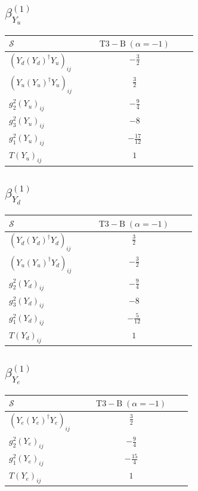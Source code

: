 \documentclass[9pt]{article}
\begin{document}
\subsection*{$ \beta_{Y_u}^{(1)} $}
\begin{longtable}{@{}p{0.38\linewidth}c@{}}
\toprule
$\mathcal{S}$ & $ \mathrm{T3-B}\;(\alpha=-1) $ \\
\midrule
$ (Y_d (Y_d)^{\dagger} Y_u)_{ij} $ & $ - \frac{3}{2} $ \\
$ (Y_u (Y_u)^{\dagger} Y_u)_{ij} $ & $ \frac{3}{2} $ \\
$ g_2^2 (Y_u)_{ij} $ & $ - \frac{9}{4} $ \\
$ g_3^2 (Y_u)_{ij} $ & $ -8 $ \\
$ g_1^2 (Y_u)_{ij} $ & $ - \frac{17}{12} $ \\
$ T (Y_u)_{ij} $ & $ 1 $ \\
\bottomrule
\end{longtable}
\subsection*{$ \beta_{Y_d}^{(1)} $}
\begin{longtable}{@{}p{0.38\linewidth}c@{}}
\toprule
$\mathcal{S}$ & $ \mathrm{T3-B}\;(\alpha=-1) $ \\
\midrule
$ (Y_d (Y_d)^{\dagger} Y_d)_{ij} $ & $ \frac{3}{2} $ \\
$ (Y_u (Y_u)^{\dagger} Y_d)_{ij} $ & $ - \frac{3}{2} $ \\
$ g_2^2 (Y_d)_{ij} $ & $ - \frac{9}{4} $ \\
$ g_3^2 (Y_d)_{ij} $ & $ -8 $ \\
$ g_1^2 (Y_d)_{ij} $ & $ - \frac{5}{12} $ \\
$ T (Y_d)_{ij} $ & $ 1 $ \\
\bottomrule
\end{longtable}
\subsection*{$ \beta_{Y_e}^{(1)} $}
\begin{longtable}{@{}p{0.38\linewidth}c@{}}
\toprule
$\mathcal{S}$ & $ \mathrm{T3-B}\;(\alpha=-1) $ \\
\midrule
$ (Y_e (Y_e)^{\dagger} Y_e)_{ij} $ & $ \frac{3}{2} $ \\
$ g_2^2 (Y_e)_{ij} $ & $ - \frac{9}{4} $ \\
$ g_1^2 (Y_e)_{ij} $ & $ - \frac{15}{4} $ \\
$ T (Y_e)_{ij} $ & $ 1 $ \\
\bottomrule
\end{longtable}
\end{document}
